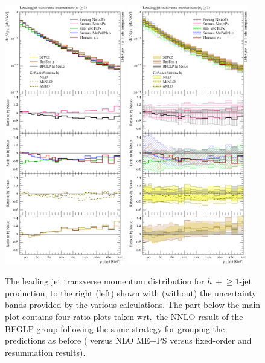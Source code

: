 \begin{figure}[t!]
  \centering
  \includegraphics[width=0.47\textwidth]{figures/hjetscomp_u_jet1_pT_incl.pdf}
  \hfill
  \includegraphics[width=0.47\textwidth]{figures/hjetscomp_jet1_pT_incl.pdf}
  \caption{\label{fig:hjetscomp:results:1obs:j1pt}%
    The leading jet transverse momentum distribution for
    $h\,+\!\ge\!1$-jet production, to the right (left) shown with
    (without) the uncertainty bands provided by the various
    calculations. The part below the main plot contains four ratio
    plots taken wrt.~the NNLO result of the BFGLP group following the
    same strategy for grouping the predictions as before (\hjetscompNNLOPS
    versus NLO ME+PS versus fixed-order and resummation results).}
\end{figure}

